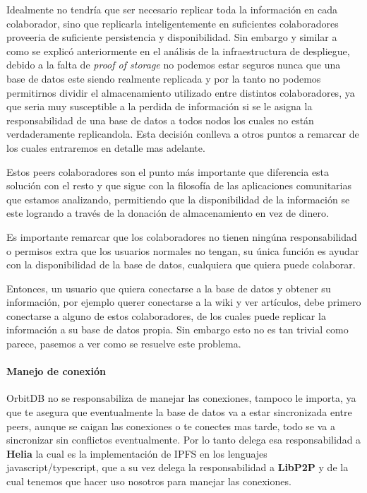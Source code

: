 Idealmente no tendría que ser necesario replicar toda la información en cada colaborador, sino que replicarla inteligentemente en suficientes colaboradores proveeria de suficiente persistencia y disponibilidad. Sin embargo y similar a como se explicó anteriormente en el análisis de la infraestructura de despliegue, debido a la falta de \textit{proof of storage} no podemos estar seguros nunca que una base de datos este siendo realmente replicada y por la tanto no podemos permitirnos dividir el almacenamiento utilizado entre distintos colaboradores, ya que seria muy susceptible a la perdida de información si se le asigna la responsabilidad de una base de datos a todos nodos los cuales no están verdaderamente replicandola. Esta decisión conlleva a otros puntos a remarcar de los cuales entraremos en detalle mas adelante.

Estos peers colaboradores son el punto más importante que diferencia esta solución con el resto y que sigue con la filosofía de las aplicaciones comunitarias que estamos analizando, permitiendo que la disponibilidad de la información se este logrando a través de la donación de almacenamiento en vez de dinero.

Es importante remarcar que los colaboradores no tienen ningúna responsabilidad o permisos extra que los usuarios normales no tengan, su única función es ayudar con la disponibilidad de la base de datos, cualquiera que quiera puede colaborar.

Entonces, un usuario que quiera conectarse a la base de datos y obtener su información, por ejemplo querer conectarse a la wiki y ver artículos, debe primero conectarse a alguno de estos colaboradores, de los cuales puede replicar la información a su base de datos propia. Sin embargo esto no es tan trivial como parece, pasemos a ver como se resuelve este problema.

\paragraph{Manejo de conexión}

OrbitDB no se responsabiliza de manejar las conexiones, tampoco le importa, ya que te asegura que eventualmente la base de datos va a estar sincronizada entre peers, aunque se caigan las conexiones o te conectes mas tarde, todo se va a sincronizar sin conflictos eventualmente. Por lo tanto delega esa responsabilidad a \textbf{Helia}\cite{helia} la cual es la implementación de IPFS en los lenguajes javascript/typescript, que a su vez delega la responsabilidad a \textbf{LibP2P}\cite{libp2p} y de la cual tenemos que hacer uso nosotros para manejar las conexiones.

